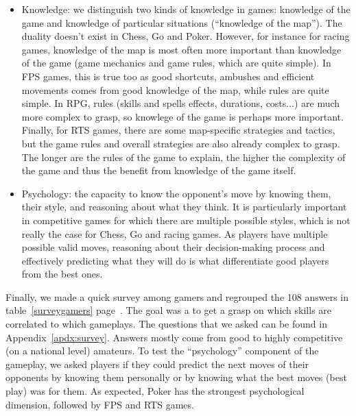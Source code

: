 \begin{itemize}
    \item Knowledge: we distinguish two kinds of knowledge in games: knowledge of the game and knowledge of particular situations (``knowledge of the map''). The duality doesn't exist in Chess, Go and Poker. However, for instance for racing games, knowledge of the map is most often more important than knowledge of the game (game mechanics and game rules, which are quite simple). In FPS games, this is true too as good shortcuts, ambushes and efficient movements comes from good knowledge of the map, while rules are quite simple. In RPG, rules (skills and spells effects, durations, costs...) are much more complex to grasp, so knowlege of the game is perhaps more important. Finally, for RTS games, there are some map-specific strategies and tactics, but the game rules and overall strategies are also already complex to grasp. The longer are the rules of the game to explain, the higher the complexity of the game and thus the benefit from knowledge of the game itself.
    \item Psychology: the capacity to know the opponent's move by knowing them, their style, and reasoning about what they think. It is particularly important in competitive games for which there are multiple possible styles, which is not really the case for Chess, Go and racing games. As players have multiple possible valid moves, reasoning about their decision-making process and effectively predicting what they will do is what differentiate good players from the best ones.
\end{itemize}

Finally, we made a quick survey among gamers and regrouped the 108 answers in table~\ref{surveygamers} page~\pageref{surveygamers}. The goal was a to get a grasp on which skills are correlated to which gameplays. The questions that we asked can be found in Appendix~\ref{apdx:survey}. Answers mostly come from good to highly competitive (on a national level) amateurs. To test the ``psychology'' component of the gameplay, we asked players if they could predict the next moves of their opponents by knowing them personally or by knowing what the best moves (best play) was for them. As expected, Poker has the strongest psychological dimension, followed by FPS and RTS games.
\\

